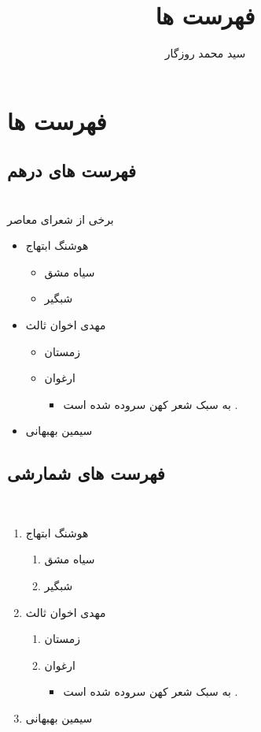 \documentclass[12pt]{book}
\title{فهرست ها}
\author{سید محمد روزگار}
\begin{document}
\maketitle

\chapter{فهرست ها}

\section{فهرست های درهم}
~\\
برخی از شعرای معاصر
\begin{itemize}
\item 
هوشنگ ابتهاج
\begin{itemize}
	\item
	سیاه مشق
	\item 
	شبگیر
\end{itemize}
\item 
مهدی اخوان ثالث
\begin{itemize}
	\item 
	زمستان
	\item 
	ارغوان
	\begin{itemize}
		\item
		به سبک شعر کهن سروده شده است .
	\end{itemize}
\end{itemize}
\item 
سیمین بهبهانی
\end{itemize}

\section{فهرست های شمارشی}
~\\

\begin{enumerate}
	\item 
	هوشنگ ابتهاج
	\begin{enumerate}
		\item
		سیاه مشق
		\item 
		شبگیر
	\end{enumerate}
	\item 
	مهدی اخوان ثالث
	\begin{enumerate}
		\item 
		زمستان
		\item 
		ارغوان
		\begin{itemize}
			\item
			به سبک شعر کهن سروده شده است .
		\end{itemize}
	\end{enumerate}
	\item 
	سیمین بهبهانی
\end{enumerate}
\end{document}
